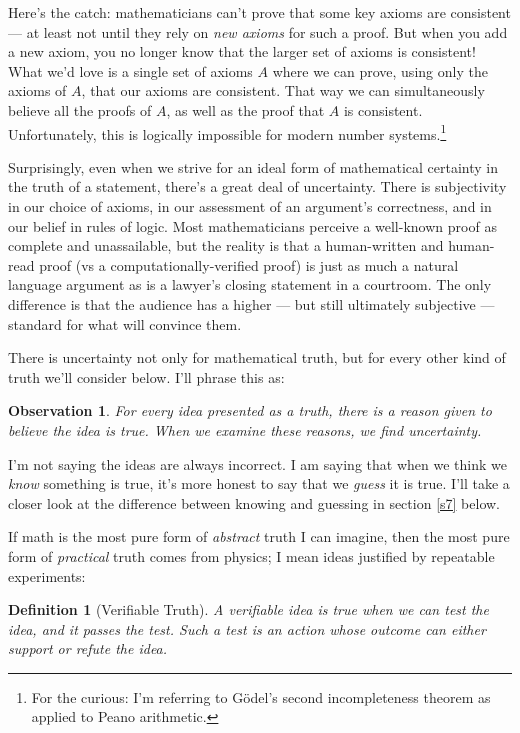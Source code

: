 \documentclass[11pt, oneside]{article}   	%
\newtheorem{defn}{Definition}
\newtheorem{obs}{Observation}
\begin{document}
\begin{itemize}
        Here's the catch: mathematicians can't prove that some key axioms are
        consistent --- at least not until they rely on {\em new axioms} for such
        a proof. But when you add a new axiom, you no longer know that the
        larger set of axioms is consistent! What we'd love is a single set of
        axioms $A$ where we can prove, using only the axioms of $A$, that our
        axioms are consistent. That way we can simultaneously believe all the
        proofs of $A$, as
        well as the proof that $A$ is consistent. Unfortunately, this is
        logically impossible for modern number
        systems.\footnote{For
        the curious: I'm referring to G\"odel's second
        incompleteness theorem as applied to Peano arithmetic.}
\end{itemize}

Surprisingly,
even when we strive for an ideal form of
mathematical certainty in the truth of a statement, there's a great deal of
uncertainty.
There is subjectivity in our choice of axioms,
in our assessment of an argument's correctness,
and
in our belief in rules of logic.
Most mathematicians perceive a well-known proof as complete and unassailable,
but the reality is that a human-written and human-read proof (vs
a computationally-verified proof) is just as much a natural language argument as
is a lawyer's closing statement in a courtroom.
The only difference is that the audience has a higher --- but still ultimately
subjective --- standard for what will convince them.

There is uncertainty not only for mathematical truth, but for
every other kind of truth we'll consider below.
I'll phrase this as:

\begin{obs}\label{o1}
    For every idea presented as a truth, there is a reason
    given to believe the idea is true.
    When we examine these reasons, we find uncertainty.
\end{obs}

I'm not saying the ideas are always incorrect. I am saying that when we think we
{\em know} something is true, it's more honest to say that we {\em guess} it is
true. I'll take a closer look at
the difference between knowing and guessing in section \ref{s7} below.

If math is the most pure form of {\em abstract} truth I can imagine, then the
most pure form of {\em practical} truth comes from physics; I mean ideas
justified by repeatable experiments:

\begin{defn}[Verifiable Truth]
    A verifiable idea is true when we can test the idea, and it passes
    the test. Such a test is an action whose outcome
    can either support or refute the idea.
\end{defn}
\end{document}
